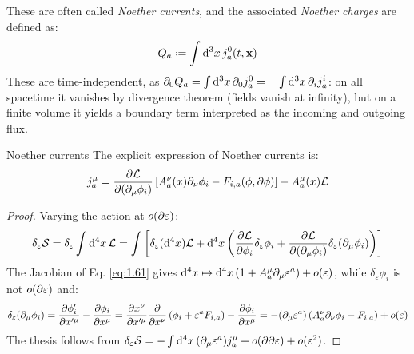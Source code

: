 These are often called \textit{Noether currents}, and the associated \textit{Noether charges} are defined as:
\begin{equation}
  Q_a \defeq \int \dd^3 x\, j^0_a(t,\ve{x})
  \label{eq:1.63}
\end{equation}
These are time-independent, as $ \partial_0 Q_a = \int \mathrm{d}^3 x\, \partial_0 j^0_a = - \int \mathrm{d}^3 x\, \partial_i j^i_a $: on all spacetime it vanishes by divergence theorem (fields vanish at infinity), but on a finite volume it yields a boundary term interpreted as the incoming and outgoing flux.

\begin{proposition}{Noether currents}{}
  The explicit expression of Noether currents is:
  \begin{equation}
    j^\mu_a = \frac{\partial \mathcal{L}}{\partial (\partial_\mu \phi_i)} \left[ A^\nu_a(x) \partial_\nu \phi_i - F_{i,a}(\phi, \partial \phi) \right] - A^\mu_a(x) \mathcal{L}
    \label{eq:1.64}
  \end{equation}

  \tcblower

  \begin{proof}
    Varying the action at $ o(\partial \varepsilon) $:
    \begin{equation*}
        \delta_\varepsilon \mathcal{S} = \delta_\varepsilon \int \mathrm{d}^4 x\, \mathcal{L} = \int \left[ \delta_\varepsilon (\mathrm{d}^4 x) \mathcal{L} + \mathrm{d}^4 x \left( \frac{\partial \mathcal{L}}{\partial \phi_i} \delta_\varepsilon \phi_i + \frac{\partial \mathcal{L}}{\partial (\partial_\mu \phi_i)} \delta_\varepsilon (\partial_\mu \phi_i) \right) \right]
    \end{equation*}
    The Jacobian of Eq. \ref{eq:1.61} gives $ \mathrm{d}^4 x \mapsto \mathrm{d}^4 x \left( 1 + A^\mu_a \partial_\mu \varepsilon^a \right) + o(\varepsilon) $, while $ \delta_\varepsilon \phi_i $ is not $ o(\partial \varepsilon) $ and:
    \begin{equation*}
      \delta_\varepsilon (\partial_\mu \phi_i) = \frac{\partial \phi'_i}{\partial x'^\mu} - \frac{\partial \phi_i}{\partial x^\mu} = \frac{\partial x^\nu}{\partial x'^\mu} \frac{\partial}{\partial x^\nu} \left( \phi_i + \varepsilon^a F_{i,a} \right) - \frac{\partial \phi_i}{\partial x^\mu} = - (\partial_\mu \varepsilon^a) \left( A^\nu_a \partial_\nu \phi_i - F_{i,a} \right) + o(\varepsilon)
    \end{equation*}
    The thesis follows from $ \delta_\varepsilon \mathcal{S} = - \int \mathrm{d}^4 x\, (\partial_\mu \varepsilon^a) j^\mu_a + o(\partial \partial \varepsilon) + o(\varepsilon^2) $.
  \end{proof}
\end{proposition}

